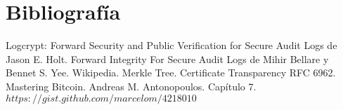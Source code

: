 \section{Bibliografía}


\begin{thebibliography}{9}
Logcrypt: Forward Security and Public Verification for Secure Audit Logs de Jason E. Holt.
Forward Integrity For Secure Audit Logs de Mihir Bellare y Bennet S. Yee.
Wikipedia. Merkle Tree.
Certificate Transparency RFC 6962.
Mastering Bitcoin. Andreas M. Antonopoulos. Cap\'itulo 7.
$https://gist.github.com/marcelom/4218010$

\end{thebibliography}